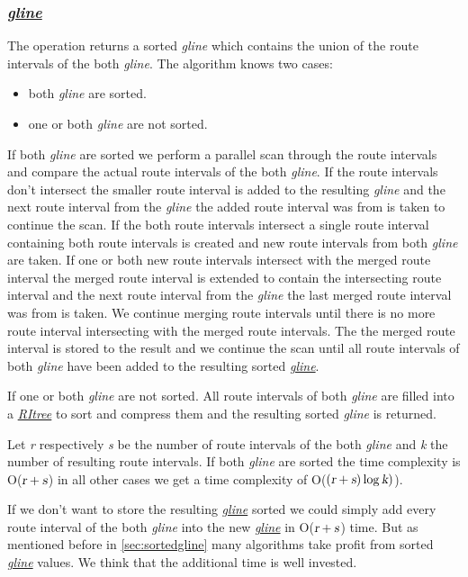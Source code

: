 \documentclass[a4paper]{article}
\newcommand{\var}[1]{\textsl{#1}}
\newcommand{\dt}[1]{\textsl{\underline{#1}}}
\begin{document}
\subsubsection{\dt{gline}}
The operation returns a sorted \var{gline} which contains the union of the route intervals of the both \var{gline}. The algorithm knows two cases:
\begin{itemize}
	\item both \var{gline} are sorted.
	\item one or both \var{gline} are not sorted.
\end{itemize}
If both \var{gline} are sorted we perform a parallel scan through the route intervals and compare the actual route intervals of the both \var{gline}. If the route intervals don't intersect the smaller route interval is added to the resulting \var{gline} and the next route interval from the \var{gline} the added route interval was from is taken to continue the scan. If the both route intervals intersect a single route interval containing both route intervals is created and new route intervals from both \var{gline} are taken. If one or both new route intervals intersect with the merged route interval the merged route interval is extended to contain the intersecting route interval and the next route interval from the \var{gline} the last merged route interval was from is taken. We continue merging route intervals until there is no more route interval intersecting with the merged route intervals. The the merged route interval is stored to the result and we continue the scan until all route intervals of both \var{gline} have been added to the resulting sorted \dt{gline}.

If one or both \var{gline} are not sorted. All route intervals of both \var{gline} are filled into a \dt{RItree} to sort and compress them and the resulting sorted \var{gline} is returned.

Let \var{r} respectively \var{s} be the number of route intervals of the both \var{gline} and \var{k} the number of resulting route intervals. If both \var{gline} are sorted the time complexity is  O($\var{r}+\var{s}$) in all other cases we get a time complexity of O($(\var{r}+\var{s}) \log \var{k})$).

If we don't want to store the resulting \dt{gline} sorted we could simply add every route interval of the both \var{gline} into the new \dt{gline} in O($\var{r}+\var{s}$) time. But as mentioned before in \ref{sec:sortedgline} many algorithms take profit from sorted \dt{gline} values. We think that the additional time is well invested.
\end{document}
